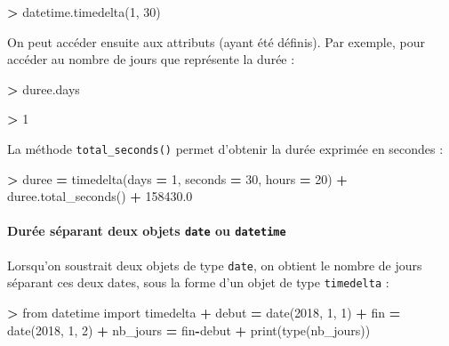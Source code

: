 \documentclass[12pt,]{book}
\newenvironment{Shaded}{\begin{snugshade}}{\end{snugshade}}
\newcommand{\DecValTok}[1]{\textcolor[rgb]{0.00,0.00,0.81}{#1}}
\newcommand{\FloatTok}[1]{\textcolor[rgb]{0.00,0.00,0.81}{#1}}
\newcommand{\ImportTok}[1]{#1}
\newcommand{\OperatorTok}[1]{\textcolor[rgb]{0.81,0.36,0.00}{\textbf{#1}}}
\newcommand{\BuiltInTok}[1]{#1}
\newcommand{\NormalTok}[1]{#1}
\let\oldparagraph\paragraph
\renewcommand{\paragraph}[1]{\oldparagraph{#1}\mbox{}}
\numberwithin{equation}{section}
\numberwithin{countremarque}{section}
\begin{document}
\begin{Shaded}
\begin{Highlighting}[]
\OperatorTok{>}\NormalTok{ datetime.timedelta(}\DecValTok{1}\NormalTok{, }\DecValTok{30}\NormalTok{)}
\end{Highlighting}
\end{Shaded}

On peut accéder ensuite aux attributs (ayant été définis). Par exemple,
pour accéder au nombre de jours que représente la durée :

\begin{Shaded}
\begin{Highlighting}[]
\OperatorTok{>}\NormalTok{ duree.days}
\end{Highlighting}
\end{Shaded}

\begin{Shaded}
\begin{Highlighting}[]
\OperatorTok{>} \DecValTok{1}
\end{Highlighting}
\end{Shaded}

La méthode \texttt{total\_seconds()} permet d'obtenir la durée exprimée
en secondes :

\begin{Shaded}
\begin{Highlighting}[]
\OperatorTok{>}\NormalTok{ duree }\OperatorTok{=}\NormalTok{ timedelta(days }\OperatorTok{=} \DecValTok{1}\NormalTok{, seconds }\OperatorTok{=} \DecValTok{30}\NormalTok{, hours }\OperatorTok{=} \DecValTok{20}\NormalTok{)}
\OperatorTok{+}\NormalTok{ duree.total_seconds()}
\OperatorTok{+} \FloatTok{158430.0}
\end{Highlighting}
\end{Shaded}

\paragraph{\texorpdfstring{Durée séparant deux objets \texttt{date} ou
\texttt{datetime}}{Durée séparant deux objets date ou datetime}}\label{duree-separant-deux-objets-date-ou-datetime}

Lorsqu'on soustrait deux objets de type \texttt{date}, on obtient le
nombre de jours séparant ces deux dates, sous la forme d'un objet de
type \texttt{timedelta} :

\begin{Shaded}
\begin{Highlighting}[]
\OperatorTok{>} \ImportTok{from}\NormalTok{ datetime }\ImportTok{import}\NormalTok{ timedelta}
\OperatorTok{+}\NormalTok{ debut }\OperatorTok{=}\NormalTok{ date(}\DecValTok{2018}\NormalTok{, }\DecValTok{1}\NormalTok{, }\DecValTok{1}\NormalTok{)}
\OperatorTok{+}\NormalTok{ fin }\OperatorTok{=}\NormalTok{ date(}\DecValTok{2018}\NormalTok{, }\DecValTok{1}\NormalTok{, }\DecValTok{2}\NormalTok{)}
\OperatorTok{+}\NormalTok{ nb_jours }\OperatorTok{=}\NormalTok{ fin}\OperatorTok{-}\NormalTok{debut}
\OperatorTok{+} \BuiltInTok{print}\NormalTok{(}\BuiltInTok{type}\NormalTok{(nb_jours))}
\end{Highlighting}
\end{Shaded}
\end{document}
